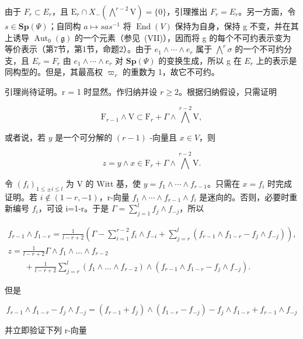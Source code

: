 由于 \(F_{r} \subset E_{r}\)，且 \(\mathrm{E}_{r} \cap X_{-}(\bigwedge^{r-2}\mathrm{V}) = \{0\}\)，引理推出 \(F_{r} = E_{r}\)。另一方面，令 \(s \in \mathbf{Sp}(\varPsi)\)；自同构 \(a \mapsto sas^{-1}\) 将 \(\operatorname{End}(V)\) 保持为自身，保持 g 不变，并在其上诱导 \(\operatorname{Aut}_{0}(\mathfrak{g})\) 的一个元素（参见~(VII)），因而将 g 的每个不可约表示变为等价表示（第7节，第1节，命题2）。由于 \(e_{1} \wedge \cdots \wedge e_{r}\) 属于 \(\bigwedge^{r}\sigma\) 的一个不可约分支，且 \(E_{r} = F_{r}\) 由 \(e_{1} \wedge \cdots \wedge e_{r}\) 对 \(\mathbf{Sp}(\varPsi)\) 的变换生成，所以 g 在 \(E_{r}\) 上的表示是同构型的。但是，其最高权 \(\varpi_{r}\) 的重数为 1，故它不可约。

引理尚待证明。r = 1 时显然。作归纳并设 \(r \geq 2\)。根据归纳假设，只需证明

\[
\mathrm{F} _ {r - 1} \wedge \mathrm{V} \subset \mathrm{F} _ {r} + \Gamma \wedge \bigwedge^ {r - 2} \mathrm{V},
\]

或者说，若 \(y\) 是一个可分解的 \((r - 1)\) -向量且 \(x \in V\)，则

\[
z = y \wedge x \in \mathrm{F} _ {r} + \Gamma \wedge \bigwedge^ {r - 2} \mathrm{V}.
\]

令 \((f_{i})_{1\leq\pm i\leq l}\) 为 V 的 Witt 基，使 \(y=f_{1}\wedge\cdots\wedge f_{r-1}\)。只需在 \(x=f_{i}\) 时完成证明。若 \(i\notin(1-r,-1)\)，r-向量 \(f_{1}\wedge\cdots\wedge f_{r-1}\wedge f_{i}\) 是迷向的。否则，必要时重新编号 \(f_{i}\)，可设 i=1-r。于是 \(\Gamma=\sum_{j=1}^{l}f_{j}\wedge f_{-j}\)，所以

\[
\begin{array}{l} f _ {r - 1} \wedge f _ {1 - r} = \frac {1}{l - r + 2} \left(\Gamma - \sum_ {i = 1} ^ {r - 2} f _ {i} \wedge f _ {- i} + \sum_ {j = r} ^ {l} (f _ {r - 1} \wedge f _ {1 - r} - f _ {j} \wedge f _ {- j})\right), \\ z = \frac {1}{l - r + 2} \Gamma \wedge f _ {1} \wedge \dots \wedge f _ {r - 2} \\ \qquad + \frac {1}{l - r + 2} \sum_ {j = r} ^ {l} (f _ {1} \wedge \dots \wedge f _ {r - 2}) \wedge (f _ {r - 1} \wedge f _ {1 - r} - f _ {j} \wedge f _ {- j}). \end{array}
\]

但是

\[
f _ {r - 1} \wedge f _ {1 - r} - f _ {j} \wedge f _ {- j} = (f _ {r - 1} + f _ {j}) \wedge (f _ {1 - r} - f _ {- j}) - f _ {j} \wedge f _ {1 - r} + f _ {r - 1} \wedge f _ {- j}
\]

并立即验证下列 r-向量

